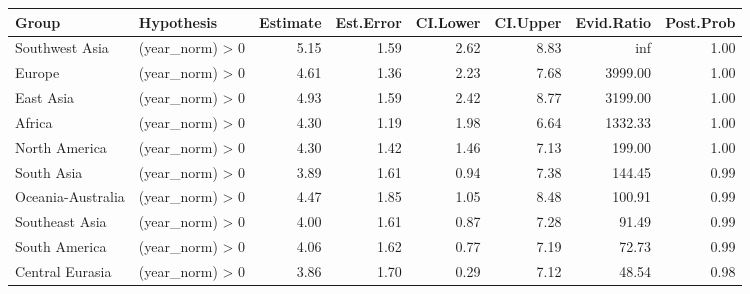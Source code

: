 \begin{tabular}{llrrrrrr}
\toprule
Group & Hypothesis & Estimate & Est.Error & CI.Lower & CI.Upper & Evid.Ratio & Post.Prob \\
\midrule
Southwest Asia & (year_norm) > 0 & 5.15 & 1.59 & 2.62 & 8.83 & inf & 1.00 \\
Europe & (year_norm) > 0 & 4.61 & 1.36 & 2.23 & 7.68 & 3999.00 & 1.00 \\
East Asia & (year_norm) > 0 & 4.93 & 1.59 & 2.42 & 8.77 & 3199.00 & 1.00 \\
Africa & (year_norm) > 0 & 4.30 & 1.19 & 1.98 & 6.64 & 1332.33 & 1.00 \\
North America & (year_norm) > 0 & 4.30 & 1.42 & 1.46 & 7.13 & 199.00 & 1.00 \\
South Asia & (year_norm) > 0 & 3.89 & 1.61 & 0.94 & 7.38 & 144.45 & 0.99 \\
Oceania-Australia & (year_norm) > 0 & 4.47 & 1.85 & 1.05 & 8.48 & 100.91 & 0.99 \\
Southeast Asia & (year_norm) > 0 & 4.00 & 1.61 & 0.87 & 7.28 & 91.49 & 0.99 \\
South America & (year_norm) > 0 & 4.06 & 1.62 & 0.77 & 7.19 & 72.73 & 0.99 \\
Central Eurasia & (year_norm) > 0 & 3.86 & 1.70 & 0.29 & 7.12 & 48.54 & 0.98 \\
\bottomrule
\end{tabular}
